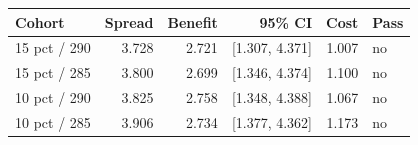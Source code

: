 \begin{tabular}{lrrrrl}\toprule
Cohort & Spread & Benefit & 95\% CI & Cost & Pass\\\midrule
15 pct / 290 & 3.728 & 2.721 & [1.307, 4.371] & 1.007 & no\\
15 pct / 285 & 3.800 & 2.699 & [1.346, 4.374] & 1.100 & no\\
10 pct / 290 & 3.825 & 2.758 & [1.348, 4.388] & 1.067 & no\\
10 pct / 285 & 3.906 & 2.734 & [1.377, 4.362] & 1.173 & no\\
\bottomrule\end{tabular}
